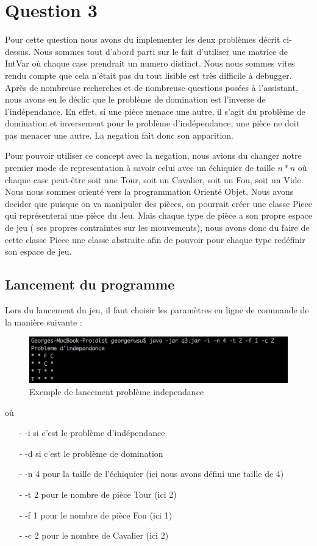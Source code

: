 \documentclass[a4paper,10pt]{article}
\begin{document}
\section{Question 3}
\par Pour cette question nous avons du implementer les deux problèmes décrit ci-dessus. Nous sommes tout d'abord parti sur le fait d'utiliser une matrice de IntVar où chaque case prendrait un numero distinct. Nous nous sommes vites rendu compte que cela n'était pas du tout lisible est très difficile à debugger. Après de nombreuse recherches et de nombreuse questions posées à l'assistant, nous avons eu le déclic que le problème de domination est l'inverse de l'indépendance. En effet, si une pièce menace une autre, il s'agit du problème de domination et inversement pour le problème d'indépendance, une pièce ne doit pas menacer une autre. La negation fait donc son apparition.
\par Pour pouvoir utiliser ce concept avec la negation, nous avions du changer notre premier mode de representation à savoir celui avec un échiquier de taille $n*n$ où chaque case peut-être soit une Tour, soit un Cavalier, soit un Fou, soit un Vide. Nous nous sommes orienté vers la programmation Orienté Objet. Nous avons decider que puisque on va manipuler des pièces, on pourrait créer une classe Piece qui représenterai une pièce du Jeu. Mais chaque type de pièce a son propre espace de jeu ( ses propres contraintes sur les mouvements), nous avons donc du faire de cette classe Piece une classe abstraite afin de pouvoir pour chaque type redéfinir son espace de jeu.
	
\subsection{Lancement du programme}
\par Lors du lancement du jeu, il faut choisir les paramètres en ligne de commande de la manière suivante :
\begin{figure}[!h]
  \includegraphics[width=\linewidth]{img/q3.png}
  \caption{Exemple de lancement problème independance}
\end{figure}
\par où
\begin{enumerate}
	\item[-] -i si c'est le problème d'indépendance
	\item[-] -d si c'est le problème de domination
	\item[-] -n 4 pour la taille de l'échiquier (ici nous avons défini une taille de 4)
	\item[-] -t 2 pour le nombre de pièce Tour (ici 2)
	\item[-] -f 1 pour le nombre de pièce Fou (ici 1)
	\item[-] -c 2 pour le nombre de Cavalier (ici 2)
\end{enumerate}
\end{document}
